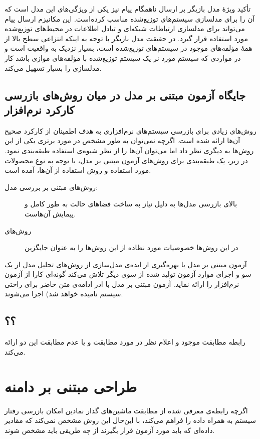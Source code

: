 تأکید ویژهٔ مدل بازیگر بر ارسال ناهمگام پیام نیز یکی از ویژگی‌های این مدل است که آن را برای مدلسازی سیستم‌های توزیع‌شده مناسب کرده‌است.
این مکانیزم ارسال پیام می‌تواند برای مدلسازی ارتباطات شبکه‌ای و تیادل اطلاعات در محیط‌های توزیع‌شده مورد استفاده قرار گیرد.
در حقیقت مدل بازیگر با توجه به اینکه انتزاعی سطح بالا از همهٔ مؤلفه‌های موجود در سیستم‌های توزیع‌شده است، بسیار نزدیک به واقعیت است و در مواردی که سیستم مورد نر یک سیستم توزیع‌شده با مؤلفه‌های موازی باشد کار مدلسازی را بسیار تسهیل می‌کند.




\subsection{جایگاه آزمون مبتنی بر مدل در میان روش‌های بازرسی کارکرد نرم‌افزار}
روش‌های زیادی برای بازرسی سیستم‌های نرم‌افزاری به هدف اطمینان از کارکرد صحیح آن‌ها ارائه شده است. اگرچه نمی‌توان به طور مشخص در مورد برتری یکی از این روش‌ها به دیگری نظر داد اما می‌‌توان آن‌ها را از نظر شیوه‌ی استفاده طبقه‌بندی نمود. در زیر، یک طبقه‌بندی برای روش‌های آزمون مبتنی بر مدل، با توجه به نوع محصولات مورد استفاده و روش استفاده از آن‌ها، آمده است.

\begin{description}
\item[روش‌های مبتنی بر بررسی مدل:]
بالای بازرسی مدل‌ها به دلیل نیاز به ساخت فضاهای حالت به طور کامل و پیمایش آن‌هاست.
\item[روش‌های ] در این روش‌ها خصوصیات مورد نظاده از این روش‌ها را به عنوان جایگزین 
\end{description}

آزمون مبتنی بر مدل با بهره‌گیری از ایده‌ی مدل‌سازی از روش‌های تحلیل مدل از یک سو و اجرای موارد آزمون تولید شده از سوی دیگر تلاش می‌کند گونه‌ای کارا از آزمون نرم‌افزار را ارائه نماید. آزمون مبتنی بر مدل با ادر ادامه‌ی متن حاضر برای راحتی سیستم نامیده خواهد شد) اجرا می‌شوند. 

\subsection{؟؟}
\label{subsection:ioco}
رابطه مطابقت موجود و اعلام نظر در مورد مطابقت و یا عدم مطابقت این دو ارائه می‌کند.


\section{طراحی مبتنی بر دامنه}
\label{section:CategoryPartitionMethod}
اگرچه رابطه‌ی معرفی شده از مطابقت ماشین‌های گذار نمادین امکان بازرسی رفتار سیستم به همراه داده را فراهم می‌کند، با این‌حال این روش مشخص نمی‌کند که مقادیر داده‌ای که باید مورد آزمون قرار بگیرند از چه طریقی باید مشخص شوند. 
 
